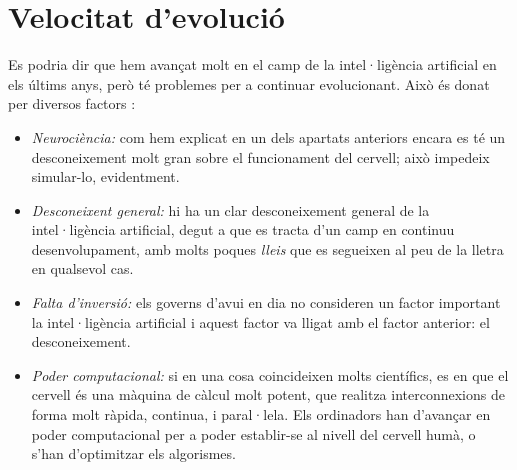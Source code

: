 \section {Velocitat d'evolució}
Es podria dir que hem avançat molt en el camp de la intel·ligència artificial en els últims anys, però té problemes per a continuar evolucionant. Això és
donat per diversos factors \cite{pbs}:
\begin {itemize}
\item \emph{Neurociència:} com hem explicat en un dels apartats anteriors encara es té un desconeixement molt gran sobre el funcionament del cervell; això impedeix simular-lo, evidentment.
\item \emph{Desconeixent general:} hi ha un clar desconeixement general de la intel·ligència artificial, degut a que es tracta d'un camp en continuu desenvolupament, amb molts poques \emph{lleis} que es segueixen al peu de la lletra en qualsevol cas.
\item \emph{Falta d'inversió:} els governs d'avui en dia no consideren un factor important la intel·ligència artificial i aquest factor va lligat amb el factor anterior: el desconeixement.
\item \emph{Poder computacional:} si en una cosa coincideixen molts científics, es en que el cervell és una màquina de càlcul molt potent, que realitza interconnexions de forma molt ràpida, continua, i paral·lela. Els ordinadors han d'avançar en poder computacional per a poder establir-se al nivell del cervell humà, o s'han d'optimitzar els algorismes.
\end {itemize}
